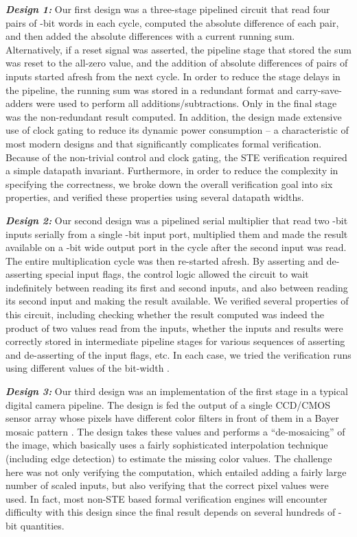\documentclass{llncs}
\begin{document}
{\bfseries \emph{Design 1:}} Our first design was a three-stage
pipelined circuit that read four pairs of -bit words in each cycle,
computed the absolute difference of each pair, and then added the
absolute differences with a current running sum.  Alternatively, if a
reset signal was asserted, the pipeline stage that stored the sum was
reset to the all-zero value, and the addition of absolute differences
of pairs of inputs started afresh from the next cycle.  In order to
reduce the stage delays in the pipeline, the running sum was stored in
a redundant format and carry-save-adders were used to perform all
additions/subtractions. Only in the final stage was the non-redundant
result computed. In addition, the design made extensive use of clock
gating to reduce its dynamic power consumption -- a characteristic of
most modern designs and that significantly complicates formal
verification.  Because of the non-trivial control and
clock gating, the STE verification required a simple datapath
invariant.  Furthermore, in order to reduce the complexity in
specifying the correctness, we broke down the overall verification
goal into six properties, and verified these properties using several
datapath widths.

{\bfseries \emph{Design 2:}} Our second design was a pipelined serial
multiplier that read two -bit inputs serially from a single -bit
input port, multiplied them and made the result available on a
-bit wide output port in the cycle after the second input was
read.  The entire multiplication cycle was then re-started afresh.  By
asserting and de-asserting special input flags, the control logic
allowed the circuit to wait indefinitely between reading its first and
second inputs, and also between reading its second input and making
the result available.  We verified several properties of this circuit,
including checking whether the result computed was indeed the product
of two values read from the inputs, whether the inputs and results
were correctly stored in intermediate pipeline stages for various
sequences of asserting and de-asserting of the input flags, etc.  In
each case, we tried the verification runs using different values of
the bit-width .

{\bfseries \emph{Design 3:}} Our third design was an implementation of
the first stage in a typical digital camera pipeline.  The design is
fed the output of a single CCD/CMOS sensor array whose pixels have
different color filters in front of them in a Bayer mosaic pattern
\cite{MalvarLiWeiCutler04}. The design takes these values and performs
a ``de-mosaicing'' of the image, which basically uses a fairly
sophisticated interpolation technique (including edge detection) to
estimate the missing color values.  The challenge here was not only
verifying the computation, which entailed adding a fairly large number
of scaled inputs, but also verifying that the correct pixel values
were used. In fact, most non-STE based formal verification engines will
encounter difficulty with this design since the final result depends on
several hundreds of -bit quantities.
\end{document}

